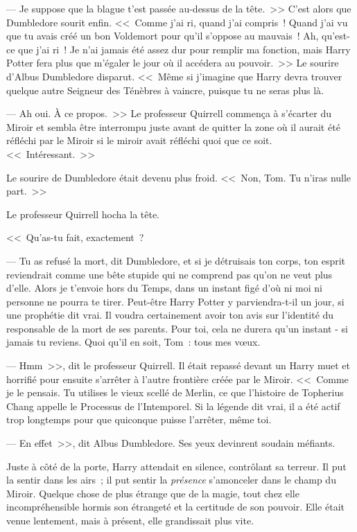 --- Je suppose que la blague t'est passée au-dessus de la tête.~>> C'est alors que Dumbledore sourit enfin. <<~Comme j'ai ri, quand j'ai compris~! Quand j'ai vu que tu avais créé un bon Voldemort pour qu'il s'oppose au mauvais~! Ah, qu'est-ce que j'ai ri~! Je n'ai jamais été assez dur pour remplir ma fonction, mais Harry Potter fera plus que m'égaler le jour où il accédera au pouvoir.~>> Le sourire d'Albus Dumbledore disparut. <<~Même si j'imagine que Harry devra trouver quelque autre Seigneur des Ténèbres à vaincre, puisque tu ne seras plus là.

--- Ah oui. À ce propos.~>> Le professeur Quirrell commença à s'écarter du Miroir et sembla être interrompu juste avant de quitter la zone où il aurait été réfléchi par le Miroir si le miroir avait réfléchi quoi que ce soit. <<~Intéressant.~>>

Le sourire de Dumbledore était devenu plus froid. <<~Non, Tom. Tu n'iras nulle part.~>>

Le professeur Quirrell hocha la tête.

<<~Qu'as-tu fait, exactement~?

--- Tu as refusé la mort, dit Dumbledore, et si je détruisais ton corps, ton esprit reviendrait comme une bête stupide qui ne comprend pas qu'on ne veut plus d'elle. Alors je t'envoie hors du Temps, dans un instant figé d'où ni moi ni personne ne pourra te tirer. Peut-être Harry Potter y parviendra-t-il un jour, si une prophétie dit vrai. Il voudra certainement avoir ton avis sur l'identité du responsable de la mort de ses parents. Pour toi, cela ne durera qu'un instant - si jamais tu reviens. Quoi qu'il en soit, Tom~: tous mes vœux.

--- Hmm~>>, dit le professeur Quirrell. Il était repassé devant un Harry muet et horrifié pour ensuite s'arrêter à l'autre frontière créée par le Miroir. <<~Comme je le pensais. Tu utilises le vieux scellé de Merlin, ce que l'histoire de Topherius Chang appelle le Processus de l'Intemporel. Si la légende dit vrai, il a été actif trop longtemps pour que quiconque puisse l'arrêter, même toi.

--- En effet~>>, dit Albus Dumbledore. Ses yeux devinrent soudain méfiants.

Juste à côté de la porte, Harry attendait en silence, contrôlant sa terreur. Il put la sentir dans les airs~; il put sentir la \emph{présence} s'amonceler dans le champ du Miroir. Quelque chose de plus étrange que de la magie, tout chez elle incompréhensible hormis son étrangeté et la certitude de son pouvoir. Elle était venue lentement, mais à présent, elle grandissait plus vite.

